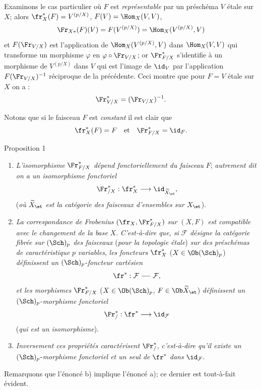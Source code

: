 Examinons le cas particulier où $F$ est \emph{représentable} par un préschéma $V$ étale sur $X$; alors $\fr_X^*(F)=V^{(p/X)}$, $F(V)=\Hom_X(V,V)$,
\[
\Fr_{X*}(F)(V)=F(V^{(p/X)})=\Hom_X(V^{(p/X)},V)
\]
et $F(\Fr_{V/X})$ est l'application de $\Hom_X(V^{(p/X)},V)$ dans $\Hom_X(V,V)$ qui transforme un morphisme $\varphi$ en $\varphi\circ\Fr_{V/X}$; or $\Fr^*_{F/X}$ s'identifie à un morphisme de $V^{(p/X)}$ dans $V$ qui est l'image de $\id_V$ par l'application $F(\Fr_{V/X})^{-1}$ réciproque de la précédente. Ceci montre que pour $F=V$ étale sur $X$ on a :
\[
\Fr^*_{V/X}=(\Fr_{V/X})^{-1}.
\]

Notons que si le faisceau $F$ est \emph{constant} il est clair que
\[
\fr_X^*(F)=F
\quad\text{et}\quad
\Fr^*_{F/X}=\id_F.
\]

\begin{statement}{Proposition 1}
\begin{enumerate}[label=\alph*)]
\item \emph{L'isomorphisme} $\Fr^*_{F/X}$ \emph{dépend fonctoriellement du faisceau} $F$; \emph{autrement dit on a un isomorphisme fonctoriel}
\[
\Fr^*_{/X}:\fr_X^*\longrightarrow \id_{\widetilde X_{\et}},
\]
(\emph{où} $\widetilde X_{\et}$ \emph{est la catégorie des faisceaux d'ensembles sur} $X_{\et}$).
\item \emph{La correspondance de Frobenius} $(\fr_X,\Fr^*_{F/X})$ \emph{sur} $(X,F)$ \emph{est compatible avec le changement de la base} $X$. \emph{C'est-à-dire que, si} $\mathcal{F}$ \emph{désigne la catégorie fibrée sur} $(\Sch)_p$ \emph{des faisceaux} (\emph{pour la topologie étale}) \emph{sur des préschémas de caractéristique} $p$ \emph{variables}, \emph{les foncteurs} $\fr_X^*$ ($X\in\Ob(\Sch)_p$) \emph{définissent un} $(\Sch)_p$-\emph{foncteur cartésien}
\[
\fr^*: \mathcal{F}\relbar\joinrel\relbar\mathcal{F},
\]
\emph{et les morphismes} $\Fr^*_{F/X}$ ($X\in\Ob(\Sch)_p$, $F\in\Ob\widetilde X_{\et}$) \emph{définissent un} $(\Sch)_p$-\emph{morphisme fonctoriel}
\[
\Fr^*_{/}:\fr^*\longrightarrow\id_{\mathcal{F}}
\]
(\emph{qui est un isomorphisme}).
\item \emph{Inversement ces propriétés caractérisent} $\Fr^*_{/}$, \emph{c'est-à-dire qu'il existe un} $(\Sch)_p$-\emph{morphisme fonctoriel et un seul de} $\fr^*$ \emph{dans} $\id_{\mathcal{F}}$.
\end{enumerate}
\end{statement}

Remarquons que l'énoncé b) implique l'énoncé a); ce dernier est tout-à-fait évident.


